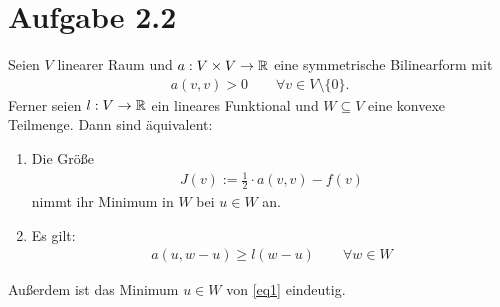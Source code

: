 \documentclass[12pt,a4paper]{article}
\begin{document}
\section*{Aufgabe 2.2}
Seien $V$ linearer Raum und $a:V\times V\to\mathbb{R}$ eine symmetrische Bilinearform mit
\begin{align*}
a(v,v)>0\qquad\forall v\in V\setminus\lbrace0\rbrace.
\end{align*}
Ferner seien $l:V\to\mathbb{R}$ ein lineares Funktional und $W\subseteq V$ eine konvexe Teilmenge. Dann sind äquivalent:
\begin{enumerate}[label=(\roman*)]
\item Die Größe
\begin{align}\label{eq1}
J(v):=\frac{1}{2}\cdot a(v,v)-f(v)
\end{align}
nimmt ihr Minimum in $W$ bei $u\in W$ an.
\item Es gilt:
\begin{align}\label{eq2}
a(u,w-u)\geq l(w-u)\qquad\forall w\in W
\end{align}
\end{enumerate}
Außerdem ist das Minimum $u\in W$ von \eqref{eq1} eindeutig.
\end{document}
